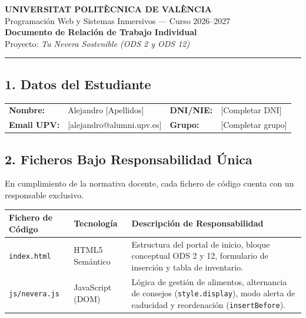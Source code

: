 \documentclass[11pt,a4paper]{article}
\begin{document}
\begin{center}
    {\Large \textbf{UNIVERSITAT POLITÈCNICA DE VALÈNCIA}}\\[0.2cm]
    {\large Programación Web y Sistemas Inmersivos --- Curso 2026--2027}\\[0.3cm]
    {\LARGE \textbf{\color{azulOscuro}Documento de Relación de Trabajo Individual}}\\[0.2cm]
    {\small Proyecto: \textit{Tu Nevera Sostenible (ODS 2 y ODS 12)}}
\end{center}

\vspace{0.3cm}
\hrule
\vspace{0.4cm}

\subsection*{1. Datos del Estudiante}
\begin{tabularx}{\textwidth}{l X l X}
    \textbf{Nombre:} & Alejandro [Apellidos] & \textbf{DNI/NIE:} & [Completar DNI] \\
    \textbf{Email UPV:} & [alejandro@alumni.upv.es] & \textbf{Grupo:} & [Completar grupo] \\
\end{tabularx}

\vspace{0.4cm}
\subsection*{2. Ficheros Bajo Responsabilidad Única}
En cumplimiento de la normativa docente, cada fichero de código cuenta con un responsable exclusivo.
\begin{table}[h!]
\centering
\small
\begin{tabularx}{\textwidth}{p{4cm} p{3.5cm} X}
\toprule
\textbf{Fichero de Código} & \textbf{Tecnología} & \textbf{Descripción de Responsabilidad} \\
\midrule
\texttt{index.html} & HTML5 Semántico & Estructura del portal de inicio, bloque conceptual ODS 2 y 12, formulario de inserción y tabla de inventario. \\
\addlinespace
\texttt{js/nevera.js} & JavaScript (DOM) & Lógica de gestión de alimentos, alternancia de consejos (\texttt{style.display}), modo alerta de caducidad y reordenación (\texttt{insertBefore}). \\
\bottomrule
\end{tabularx}
\end{table}
\end{document}
